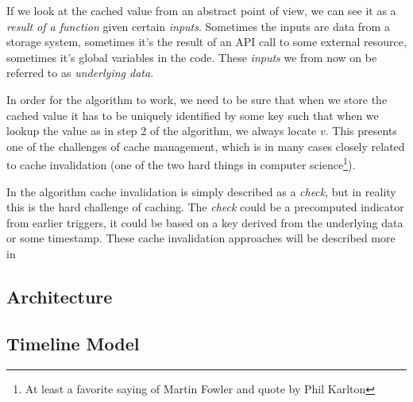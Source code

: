 If we look at the cached value from an abstract point of view, we can see it
as a \emph{result of a function} given certain \emph{inputs}. Sometimes the
inputs are data from a storage system, sometimes it's the result of an API call
to some external resource, sometimes it's global variables in the code. These
\emph{inputs} we from now on be referred to as \emph{underlying data}.

In order for the algorithm to work, we need to be sure that when we store
the cached value it has to be uniquely identified by some key such that when
we lookup the value as in step 2 of the algorithm, we always locate $v$. This
presents one of the challenges of cache management, which is in many cases
closely related to cache invalidation (one of the two hard things in computer science\footnote{At least a favorite saying of Martin Fowler and quote by Phil Karlton}).

In the algorithm cache invalidation is simply described as a \emph{check}, but
in reality this is the hard challenge of caching. The \emph{check} could be
a precomputed indicator from earlier triggers, it could be based on a key
derived from the underlying data or some timestamp. These cache invalidation
approaches will be described more in






%

\subsection{Architecture}
\label{subsec:architecture}



\subsection{Timeline Model}
\label{subsec:timeline_model}


